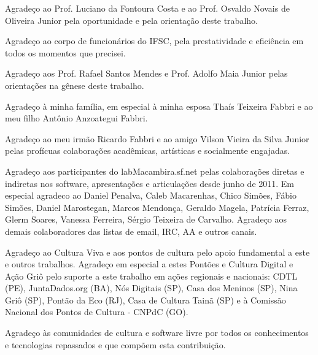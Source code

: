 

Agradeço ao Prof. Luciano da Fontoura Costa e ao Prof. Osvaldo Novais de Oliveira Junior pela oportunidade e pela orientação deste trabalho.

\vspace{4 mm}

Agradeço ao corpo de funcionários do IFSC, pela prestatividade e eficiência em todos os momentos que precisei.

\vspace{4 mm}

Agradeço aos Prof. Rafael Santos Mendes e Prof. Adolfo Maia Junior pelas orientações na gênese deste trabalho.

\vspace{4 mm}

Agradeço à minha família, em especial à minha esposa Thaís Teixeira Fabbri e ao meu filho Antônio Anzoategui Fabbri.

\vspace{4 mm}

Agradeço ao meu irmão Ricardo Fabbri e ao amigo Vilson Vieira da Silva Junior pelas profícuas colaborações acadêmicas, artísticas e socialmente engajadas.


\vspace{4 mm}

Agradeço aos participantes do labMacambira.sf.net pelas colaborações diretas e indiretas nos software, apresentações e articulações desde junho de 2011. Em especial agradeco ao Daniel Penalva, Caleb Macarenhas, Chico Simões, Fábio Simões, Daniel Marostegan, Marcos Mendonça, Geraldo Magela, Patrícia Ferraz, Glerm Soares, Vanessa Ferreira, Sérgio Teixeira de Carvalho. Agradeço aos demais colaboradores das listas de email, IRC, AA e outros canais.


\vspace{4 mm}

Agradeço ao Cultura Viva e aos pontos de cultura pelo apoio fundamental a este e outros trabalhos. Agradeço em especial a estes Pontões e Cultura Digital e Ação Griô pelo suporte a este trabalho em ações regionais e nacionais: CDTL (PE), JuntaDados.org (BA), Nós Digitais (SP), Casa dos Meninos (SP), Nina Griô (SP), Pontão da Eco (RJ), Casa de Cultura Tainã (SP) e à Comissão Nacional dos Pontos de Cultura - CNPdC (GO).


\vspace{4 mm}

Agradeço às comunidades de cultura e software livre por todos os conhecimentos e tecnologias repassados e que compõem esta contribuição. 

